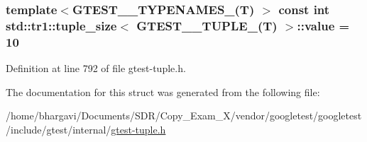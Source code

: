 \subsubsection[{\texorpdfstring{value}{value}}]{\setlength{\rightskip}{0pt plus 5cm}template$<$G\+T\+E\+S\+T\+\_\+\_\+\+T\+Y\+P\+E\+N\+A\+M\+E\+S\+\_\+(\+T) $>$ const int {\bf std\+::tr1\+::tuple\+\_\+size}$<$ {\bf G\+T\+E\+S\+T\+\_\+\_\+\+T\+U\+P\+L\+E\+\_\+}({\bf T}) $>$\+::value = 10\hspace{0.3cm}{\ttfamily [static]}}\hypertarget{structstd_1_1tr1_1_1tuple__size_3_01_g_t_e_s_t__10___t_u_p_l_e___07_t_08_01_4_a8181de395f9761be991e4cbdef144373}{}\label{structstd_1_1tr1_1_1tuple__size_3_01_g_t_e_s_t__10___t_u_p_l_e___07_t_08_01_4_a8181de395f9761be991e4cbdef144373}


Definition at line 792 of file gtest-\/tuple.\+h.



The documentation for this struct was generated from the following file\+:\begin{DoxyCompactItemize}
\item 
/home/bhargavi/\+Documents/\+S\+D\+R/\+Copy\+\_\+\+Exam\+\_\+X/vendor/googletest/googletest/include/gtest/internal/\hyperlink{gtest-tuple_8h}{gtest-\/tuple.\+h}\end{DoxyCompactItemize}
